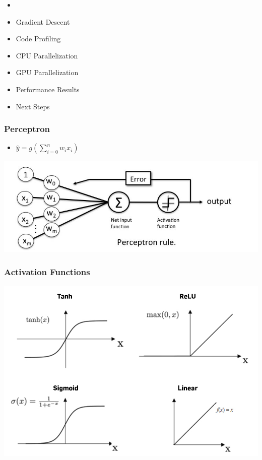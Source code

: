 \begin{frame}
\begin{itemize}
    \item \textbf{\color{red}{What are Multi-Layer Perceptrons}}
    \item Gradient Descent
    \item Code Profiling
    \item CPU Parallelization
    \item GPU Parallelization
    \item Performance Results 
    \item Next Steps
\end{itemize}
\end{frame}

\begin{frame}
    \frametitle{Perceptron}
    \begin{itemize}
        \item $\hat{y} = g(\sum_{i=0}^n w_i x_i)$
    \end{itemize}
    \center\includegraphics[width=1.0\textwidth]{Images/perceptron_learning.jpg}
\end{frame}

\begin{frame}
    \frametitle{Activation Functions}
    \center\includegraphics[width=.9\textwidth]{Images/activations.jpg}
\end{frame}

